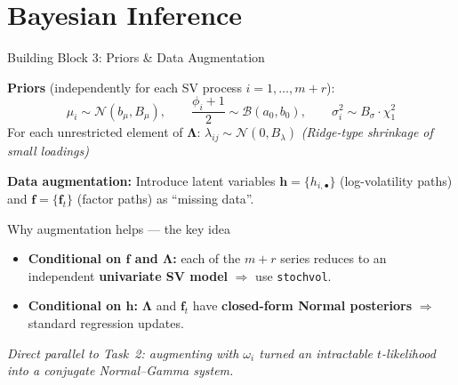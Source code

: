 \documentclass[10pt]{beamer}\usepackage[]{graphicx}\usepackage[table]{xcolor}
\begin{document}

\section{Bayesian Inference}

\begin{frame}{Building Block 3: Priors \& Data Augmentation}

  \textbf{Priors} (independently for each SV process $i = 1,\ldots,m+r$):
  \[
    \mu_i \sim \mathcal{N}(b_\mu, B_\mu), \qquad
    \frac{\phi_i+1}{2} \sim \mathcal{B}(a_0,b_0), \qquad
    \sigma_i^2 \sim B_\sigma \cdot \chi^2_1
  \]
  For each unrestricted element of $\boldsymbol{\Lambda}$:
  $\lambda_{ij} \sim \mathcal{N}(0, B_\lambda)$
  \hfill \textit{(Ridge-type shrinkage of small loadings)}

  \vspace{0.5em}

  \textbf{Data augmentation:} Introduce latent variables
  $\mathbf{h} = \{h_{i,\bullet}\}$ (log-volatility paths) and
  $\mathbf{f} = \{\mathbf{f}_{t}\}$ (factor paths) as ``missing data''.

  \vspace{0.3em}

  \begin{alertblock}{Why augmentation helps --- the key idea}
    \begin{itemize}
      \setlength\itemsep{0.4em}
      \item \textbf{Conditional on $\mathbf{f}$ and $\boldsymbol{\Lambda}$:}
            each of the $m+r$ series reduces to an independent
            \textbf{univariate SV model} $\Rightarrow$ use \texttt{stochvol}.
      \item \textbf{Conditional on $\mathbf{h}$:}
            $\boldsymbol{\Lambda}$ and $\mathbf{f}_t$ have
            \textbf{closed-form Normal posteriors}
            $\Rightarrow$ standard regression updates.
    \end{itemize}
    \vspace{0.2em}
    \textit{Direct parallel to Task~2: augmenting with $\omega_i$ turned an
    intractable $t$-likelihood into a conjugate Normal--Gamma system.}
  \end{alertblock}

\end{frame}

\end{document}
